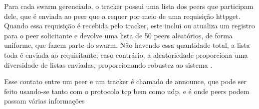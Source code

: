 Para cada \gls*{swarm} gerenciado, o \gls*{tracker} possui uma lista dos \glspl*{peer}
que participam dele, que é enviada ao \gls*{peer} que a requer por meio de uma
requisição \gls{httpget}. Quando essa requisição é recebida pelo \gls*{tracker}, este
inclui ou atualiza um registro para o \gls*{peer} solicitante e devolve uma lista de 50
\glspl*{peer} aleatórios, de forma uniforme, que fazem parte do \gls*{swarm}. Não
havendo essa quantidade total, a lista toda é enviada ao requisitante; caso contrário,
a aleatoriedade proporciona uma diversidade de listas enviadas, proporcionando robustez
ao sistema \cite{wikitheory:tracker-response}.

Esse contato entre um \gls*{peer} e um \gls*{tracker} é chamado de \gls{announce}, que
pode ser feito usando-se tanto com o protocolo \gls{tcp} bem como \gls{udp}, e é onde
\glspl*{peer} podem passam várias informações

